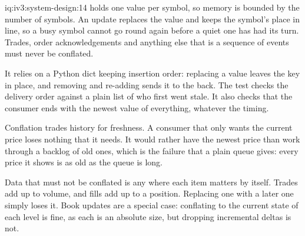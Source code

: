 \begin{solution}{iq:iv3:system-design:14}
 holds one value per symbol, so memory is bounded by the number of symbols. An update replaces the value and keeps the symbol's place in line, so a busy symbol cannot go round again before a quiet one has had its turn. Trades, order acknowledgements and anything else that is a sequence of events must never be conflated.
\label{lst:iv3:sd:conflate}

It relies on a Python dict keeping insertion order: replacing a value leaves the key in place, and removing and re-adding sends it to the back. The test checks the delivery order against a plain list of who first went stale. It also checks that the consumer ends with the newest value of everything, whatever the timing.

Conflation trades history for freshness. A consumer that only wants the current price loses nothing that it needs. It would rather have the newest price than work through a backlog of old ones, which is the failure that a plain queue gives: every price it shows is as old as the queue is long.

Data that must not be conflated is any where each item matters by itself. Trades add up to volume, and fills add up to a position. Replacing one with a later one simply loses it. Book updates are a special case: conflating to the current state of each level is fine, as each is an absolute size, but dropping incremental deltas is not. 

\end{solution}

